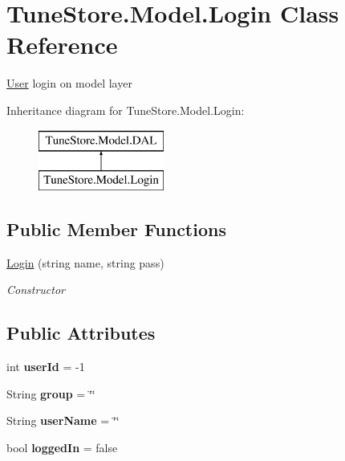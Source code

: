 \hypertarget{class_tune_store_1_1_model_1_1_login}{\section{Tune\+Store.\+Model.\+Login Class Reference}
\label{class_tune_store_1_1_model_1_1_login}
}


\hyperlink{class_tune_store_1_1_model_1_1_user}{User} login on model layer  


Inheritance diagram for Tune\+Store.\+Model.\+Login\+:\begin{figure}[H]
\begin{center}
\leavevmode
\includegraphics[height=2.000000cm]{class_tune_store_1_1_model_1_1_login}
\end{center}
\end{figure}
\subsection*{Public Member Functions}
\begin{DoxyCompactItemize}
\item 
\hyperlink{class_tune_store_1_1_model_1_1_login_a184a2123650754b3774309e52d535cc1}{Login} (string name, string pass)
\begin{DoxyCompactList}\small\item\em Constructor \end{DoxyCompactList}\end{DoxyCompactItemize}
\subsection*{Public Attributes}
\begin{DoxyCompactItemize}
\item 
\hypertarget{class_tune_store_1_1_model_1_1_login_aae18c7ab7670fa32ee078a0912fdd29e}{int {\bfseries user\+Id} = -\/1}\label{class_tune_store_1_1_model_1_1_login_aae18c7ab7670fa32ee078a0912fdd29e}

\item 
\hypertarget{class_tune_store_1_1_model_1_1_login_aebed49f7f6e757d809ec19ff90b27a8d}{String {\bfseries group} = \char`\"{}\char`\"{}}\label{class_tune_store_1_1_model_1_1_login_aebed49f7f6e757d809ec19ff90b27a8d}

\item 
\hypertarget{class_tune_store_1_1_model_1_1_login_a6cab707f0091ca10ed6e8493822d42f8}{String {\bfseries user\+Name} = \char`\"{}\char`\"{}}\label{class_tune_store_1_1_model_1_1_login_a6cab707f0091ca10ed6e8493822d42f8}

\item 
\hypertarget{class_tune_store_1_1_model_1_1_login_a3f9fb2ba7fda5853e9555673dc550c72}{bool {\bfseries logged\+In} = false}\label{class_tune_store_1_1_model_1_1_login_a3f9fb2ba7fda5853e9555673dc550c72}

\end{DoxyCompactItemize}
